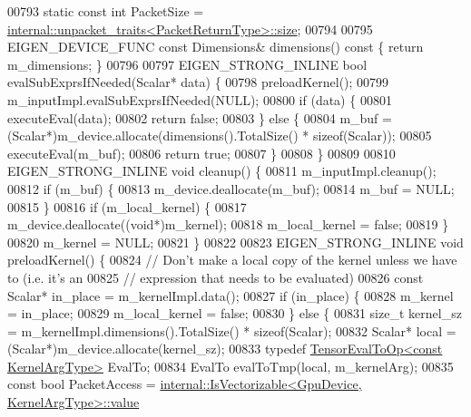 \begin{DoxyCode}
00793   \textcolor{keyword}{static} \textcolor{keyword}{const} \textcolor{keywordtype}{int} PacketSize = 
      \hyperlink{struct_eigen_1_1internal_1_1unpacket__traits}{internal::unpacket\_traits<PacketReturnType>::size};
00794 
00795   EIGEN\_DEVICE\_FUNC \textcolor{keyword}{const} Dimensions& dimensions()\textcolor{keyword}{ const }\{ \textcolor{keywordflow}{return} m\_dimensions; \}
00796 
00797   EIGEN\_STRONG\_INLINE \textcolor{keywordtype}{bool} evalSubExprsIfNeeded(Scalar* data) \{
00798     preloadKernel();
00799     m\_inputImpl.evalSubExprsIfNeeded(NULL);
00800     \textcolor{keywordflow}{if} (data) \{
00801       executeEval(data);
00802       \textcolor{keywordflow}{return} \textcolor{keyword}{false};
00803     \} \textcolor{keywordflow}{else} \{
00804       m\_buf = (Scalar*)m\_device.allocate(dimensions().TotalSize() * \textcolor{keyword}{sizeof}(Scalar));
00805       executeEval(m\_buf);
00806       \textcolor{keywordflow}{return} \textcolor{keyword}{true};
00807     \}
00808   \}
00809 
00810   EIGEN\_STRONG\_INLINE \textcolor{keywordtype}{void} cleanup() \{
00811     m\_inputImpl.cleanup();
00812     \textcolor{keywordflow}{if} (m\_buf) \{
00813       m\_device.deallocate(m\_buf);
00814       m\_buf = NULL;
00815     \}
00816     \textcolor{keywordflow}{if} (m\_local\_kernel) \{
00817       m\_device.deallocate((\textcolor{keywordtype}{void}*)m\_kernel);
00818       m\_local\_kernel = \textcolor{keyword}{false};
00819     \}
00820     m\_kernel = NULL;
00821   \}
00822 
00823   EIGEN\_STRONG\_INLINE \textcolor{keywordtype}{void} preloadKernel() \{
00824     \textcolor{comment}{// Don't make a local copy of the kernel unless we have to (i.e. it's an}
00825     \textcolor{comment}{// expression that needs to be evaluated)}
00826     \textcolor{keyword}{const} Scalar* in\_place = m\_kernelImpl.data();
00827     \textcolor{keywordflow}{if} (in\_place) \{
00828       m\_kernel = in\_place;
00829       m\_local\_kernel = \textcolor{keyword}{false};
00830     \} \textcolor{keywordflow}{else} \{
00831       \textcolor{keywordtype}{size\_t} kernel\_sz = m\_kernelImpl.dimensions().TotalSize() * \textcolor{keyword}{sizeof}(Scalar);
00832       Scalar* local = (Scalar*)m\_device.allocate(kernel\_sz);
00833       \textcolor{keyword}{typedef} \hyperlink{class_eigen_1_1_tensor_eval_to_op}{TensorEvalToOp<const KernelArgType>} EvalTo;
00834       EvalTo evalToTmp(local, m\_kernelArg);
00835       \textcolor{keyword}{const} \textcolor{keywordtype}{bool} PacketAccess = 
      \hyperlink{struct_eigen_1_1internal_1_1_is_vectorizable}{internal::IsVectorizable<GpuDevice, KernelArgType>::value}

\end{DoxyCode}

